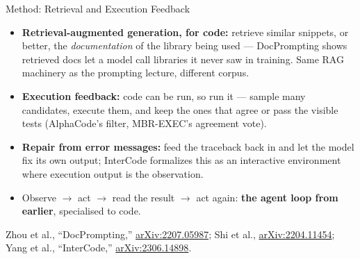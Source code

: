\begin{frame}{Method: Retrieval and Execution Feedback}
  \begin{itemize}\itemsep0.25em
    \item[\textcolor{red}{$\triangleright$}] \textbf{Retrieval-augmented generation, for code:} retrieve
      similar snippets, or better, the \emph{documentation} of the library being used --- DocPrompting shows
      retrieved docs let a model call libraries it never saw in training. Same RAG machinery as the
      prompting lecture, different corpus.
    \item[\textcolor{red}{$\triangleright$}] \textbf{Execution feedback:} code can be run, so run it ---
      sample many candidates, execute them, and keep the ones that agree or pass the visible tests
      (AlphaCode's filter, MBR-EXEC's agreement vote).
    \item[\textcolor{red}{$\triangleright$}] \textbf{Repair from error messages:} feed the traceback back
      in and let the model fix its own output; InterCode formalizes this as an interactive environment
      where execution output is the observation.
    \item[\textcolor{red}{$\triangleright$}] Observe $\rightarrow$ act $\rightarrow$ read the result
      $\rightarrow$ act again: \textbf{the agent loop from earlier}, specialised to code.
  \end{itemize}
  \vspace{0.2em}
  {\scriptsize Zhou et al., ``DocPrompting,'' \href{https://arxiv.org/abs/2207.05987}{arXiv:2207.05987};
  Shi et al., \href{https://arxiv.org/abs/2204.11454}{arXiv:2204.11454}; Yang et al., ``InterCode,''
  \href{https://arxiv.org/abs/2306.14898}{arXiv:2306.14898}.}
\end{frame}

